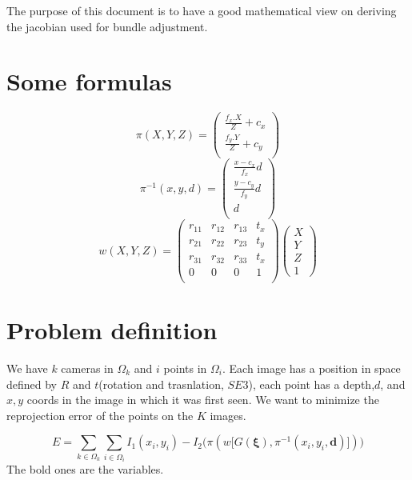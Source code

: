 \documentclass[a4paper,12pt]{article}
\begin{document}
The purpose of this document is to have a good mathematical view on deriving the jacobian used for bundle adjustment. 
\par
\section{Some formulas}

 $$ \pi(X,Y,Z) = \begin{pmatrix}
\frac{f_x.X}{Z}+c_x \\
\frac{f_y.Y}{Z}+c_y \\
\end{pmatrix} 
$$
$$
\pi^{-1}(x,y,d) = \begin{pmatrix}
\frac{x-c_x}{f_x}d \\
\frac{y-c_y}{f_y}d \\
d \\
\end{pmatrix} $$  $$
w(X,Y,Z) = \begin{pmatrix}
r_{11} & r_{12} & r_{13} & t_x \\
r_{21} & r_{22} & r_{23} & t_y \\
r_{31} & r_{32} & r_{33}& t_x \\
0 & 0 & 0 & 1 \\
\end{pmatrix}
\begin{pmatrix}
X\\ Y \\ Z \\ 1
\end{pmatrix}
$$
\par
\section{Problem definition} We have $k$ cameras in $\Omega_k$ and $i$ points in $\Omega_i$. Each image has a position in space defined by $R$ and $t$(rotation and trasnlation, $SE3$), each point has a depth,$d$, and $x,y$ coords in the image in which it was first seen. We want to minimize the reprojection error of the points on the $K$ images.

\[
E = \sum_{k \in \Omega_{k}} \sum_{i \in \Omega_{i}} I_1(x_i,y_i)-I_2\bigg(\pi(w\big[{G(\boldsymbol{\xi})},\pi^{-1}(x_i,y_i,\mathbf{d})\big])\bigg)
\]
The bold ones are the variables.
\end{document}
